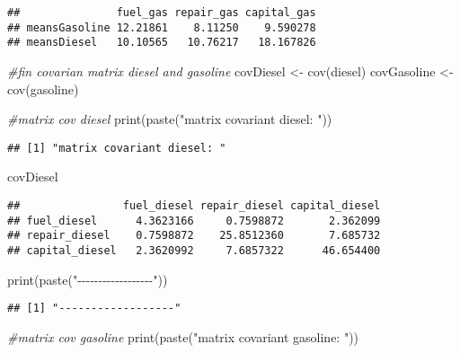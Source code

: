 \documentclass[
]{article}
\newenvironment{Shaded}{\begin{snugshade}}{\end{snugshade}}
\newcommand{\CommentTok}[1]{\textcolor[rgb]{0.56,0.35,0.01}{\textit{#1}}}
\newcommand{\FunctionTok}[1]{\textcolor[rgb]{0.00,0.00,0.00}{#1}}
\newcommand{\NormalTok}[1]{#1}
\newcommand{\OtherTok}[1]{\textcolor[rgb]{0.56,0.35,0.01}{#1}}
\newcommand{\StringTok}[1]{\textcolor[rgb]{0.31,0.60,0.02}{#1}}
\begin{document}
\begin{verbatim}
##               fuel_gas repair_gas capital_gas
## meansGasoline 12.21861    8.11250    9.590278
## meansDiesel   10.10565   10.76217   18.167826
\end{verbatim}

\begin{Shaded}
\begin{Highlighting}[]
\CommentTok{\#fin covarian matrix diesel and gasoline}
\NormalTok{covDiesel }\OtherTok{\textless{}{-}} \FunctionTok{cov}\NormalTok{(diesel)}
\NormalTok{covGasoline }\OtherTok{\textless{}{-}} \FunctionTok{cov}\NormalTok{(gasoline)}

\CommentTok{\#matrix cov diesel}
\FunctionTok{print}\NormalTok{(}\FunctionTok{paste}\NormalTok{(}\StringTok{"matrix covariant diesel: "}\NormalTok{))}
\end{Highlighting}
\end{Shaded}

\begin{verbatim}
## [1] "matrix covariant diesel: "
\end{verbatim}

\begin{Shaded}
\begin{Highlighting}[]
\NormalTok{covDiesel}
\end{Highlighting}
\end{Shaded}

\begin{verbatim}
##                fuel_diesel repair_diesel capital_diesel
## fuel_diesel      4.3623166     0.7598872       2.362099
## repair_diesel    0.7598872    25.8512360       7.685732
## capital_diesel   2.3620992     7.6857322      46.654400
\end{verbatim}

\begin{Shaded}
\begin{Highlighting}[]
\FunctionTok{print}\NormalTok{(}\FunctionTok{paste}\NormalTok{(}\StringTok{"{-}{-}{-}{-}{-}{-}{-}{-}{-}{-}{-}{-}{-}{-}{-}{-}{-}{-}"}\NormalTok{))}
\end{Highlighting}
\end{Shaded}

\begin{verbatim}
## [1] "------------------"
\end{verbatim}

\begin{Shaded}
\begin{Highlighting}[]
\CommentTok{\#matrix cov gasoline}
\FunctionTok{print}\NormalTok{(}\FunctionTok{paste}\NormalTok{(}\StringTok{"matrix covariant gasoline: "}\NormalTok{))}
\end{Highlighting}
\end{Shaded}
\end{document}

